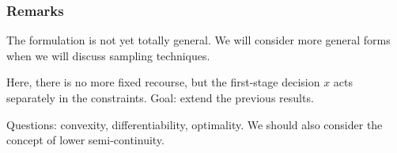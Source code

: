 \documentclass{beamer}
\begin{document}
\begin{frame}
\frametitle{Remarks}

The formulation is not yet totally general.
We will consider more general forms when we will discuss sampling techniques.

\mbox{}

Here, there is no more fixed recourse, but the first-stage decision $x$ acts separately in the constraints.
Goal: extend the previous results.

\mbox{}

Questions: convexity, differentiability, optimality.
We should also consider the concept of lower semi-continuity.

\end{frame}
\end{document}
